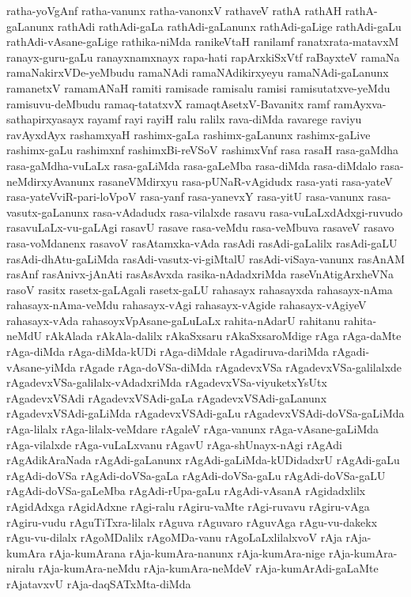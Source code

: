 {ratha-yoVgAnf
ratha-vanunx
ratha-vanonxV
rathaveV
rathA
rathAH
rathA-gaLanunx
rathAdi
rathAdi-gaLa
rathAdi-gaLanunx
rathAdi-gaLige
rathAdi-gaLu
rathAdi-vAsane-gaLige
rathika-niMda
ranikeVtaH
ranilamf
ranatxrata-matavxM
ranayx-guru-gaLu
ranayxnamxnayx
rapa-hati
rapArxkiSxVtf
raBayxteV
ramaNa
ramaNakirxVDe-yeMbudu
ramaNAdi
ramaNAdikirxyeyu
ramaNAdi-gaLanunx
ramanetxV
ramamANaH
ramiti
ramisade
ramisalu
ramisi
ramisutatxve-yeMdu
ramisuvu-deMbudu
ramaq-tatatxvX
ramaqtAsetxV-Bavanitx
ramf
ramAyxva-sathapirxyasayx
rayamf
rayi
rayiH
ralu
ralilx
rava-diMda
ravarege
raviyu
ravAyxdAyx
rashamxyaH
rashimx-gaLa
rashimx-gaLanunx
rashimx-gaLive
rashimx-gaLu
rashimxnf
rashimxBi-reVSoV
rashimxVnf
rasa
rasaH
rasa-gaMdha
rasa-gaMdha-vuLaLx
rasa-gaLiMda
rasa-gaLeMba
rasa-diMda
rasa-diMdalo
rasa-neMdirxyAvanunx
rasaneVMdirxyu
rasa-pUNaR-vAgidudx
rasa-yati
rasa-yateV
rasa-yateVviR-pari-loVpoV
rasa-yanf
rasa-yanevxY
rasa-yitU
rasa-vanunx
rasa-vasutx-gaLanunx
rasa-vAdadudx
rasa-vilalxde
rasavu
rasa-vuLaLxdAdxgi-ruvudo
rasavuLaLx-vu-gaLAgi
rasavU
rasave
rasa-veMdu
rasa-veMbuva
rasaveV
rasavo
rasa-voMdanenx
rasavoV
rasAtamxka-vAda
rasAdi
rasAdi-gaLalilx
rasAdi-gaLU
rasAdi-dhAtu-gaLiMda
rasAdi-vasutx-vi-giMtalU
rasAdi-viSaya-vanunx
rasAnAM
rasAnf
rasAnivx-jAnAti
rasAsAvxda
rasika-nAdadxriMda
raseVnAtigArxheVNa
rasoV
rasitx
rasetx-gaLAgali
rasetx-gaLU
rahasayx
rahasayxda
rahasayx-nAma
rahasayx-nAma-veMdu
rahasayx-vAgi
rahasayx-vAgide
rahasayx-vAgiyeV
rahasayx-vAda
rahasoyxVpAsane-gaLuLaLx
rahita-nAdarU
rahitanu
rahita-neMdU
rAkAlada
rAkAla-dalilx
rAkaSxsaru
rAkaSxsaroMdige
rAga
rAga-daMte
rAga-diMda
rAga-diMda-kUDi
rAga-diMdale
rAgadiruva-dariMda
rAgadi-vAsane-yiMda
rAgade
rAga-doVSa-diMda
rAgadevxVSa
rAgadevxVSa-galilalxde
rAgadevxVSa-galilalx-vAdadxriMda
rAgadevxVSa-viyuketxYsUtx
rAgadevxVSAdi
rAgadevxVSAdi-gaLa
rAgadevxVSAdi-gaLanunx
rAgadevxVSAdi-gaLiMda
rAgadevxVSAdi-gaLu
rAgadevxVSAdi-doVSa-gaLiMda
rAga-lilalx
rAga-lilalx-veMdare
rAgaleV
rAga-vanunx
rAga-vAsane-gaLiMda
rAga-vilalxde
rAga-vuLaLxvanu
rAgavU
rAga-shUnayx-nAgi
rAgAdi
rAgAdikAraNada
rAgAdi-gaLanunx
rAgAdi-gaLiMda-kUDidadxrU
rAgAdi-gaLu
rAgAdi-doVSa
rAgAdi-doVSa-gaLa
rAgAdi-doVSa-gaLu
rAgAdi-doVSa-gaLU
rAgAdi-doVSa-gaLeMba
rAgAdi-rUpa-gaLu
rAgAdi-vAsanA
rAgidadxlilx
rAgidAdxga
rAgidAdxne
rAgi-ralu
rAgiru-vaMte
rAgi-ruvavu
rAgiru-vAga
rAgiru-vudu
rAguTiTxra-lilalx
rAguva
rAguvaro
rAguvAga
rAgu-vu-dakekx
rAgu-vu-dilalx
rAgoMDalilx
rAgoMDa-vanu
rAgoLaLxlilalxvoV
rAja
rAja-kumAra
rAja-kumArana
rAja-kumAra-nanunx
rAja-kumAra-nige
rAja-kumAra-niralu
rAja-kumAra-neMdu
rAja-kumAra-neMdeV
rAja-kumArAdi-gaLaMte
rAjatavxvU
rAja-daqSATxMta-diMda
}
